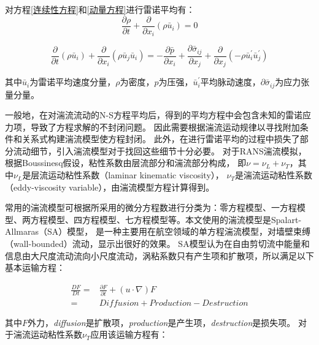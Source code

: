 \noindent 对方程\ref{连续性方程}和\ref{动量方程}进行雷诺平均有：
\begin{equation}\frac{\partial \rho}{\partial t}+\frac{\partial}{\partial x_{i}}\left(\rho \bar{u}_{i}\right)=0\end{equation}

\begin{equation}\frac{\partial}{\partial t}\left(\rho \bar{u}_{i}\right)+\frac{\partial}{\partial x_{i}}\left(\rho \bar{u}_{j} \bar{u}_{i}\right)=-\frac{\partial \bar{p}}{\partial x_{i}}+\frac{\partial \bar{\sigma}_{i j}}{\partial x_{j}}+\frac{\partial}{\partial x_{j}}\left(-\rho \bar{u}_{i}^{\prime} \bar{u}_{j}^{\prime}\right)\end{equation}

\noindent 其中$\bar{u}_{i}$为雷诺平均速度分量，$\rho$为密度，$p$为压强，$\bar{u}_{i}^{\prime}$平均脉动速度，$\partial \bar{\sigma}_{i j}$为应力张量分量。


一般地，在对湍流流动的N-S方程平均后，得到的平均方程中会包含未知的雷诺应力项，导致了方程求解的不封闭问题。
因此需要根据湍流运动规律以寻找附加条件和关系式构建湍流模型使方程封闭。
此外，在进行雷诺平均的过程中损失了部分流动细节，引入湍流模型对于找回这些细节十分必要。
对于RANS湍流模拟，根据Boussinesq\cite{schmitt2007boussinesq}假设，粘性系数由层流部分和湍流部分构成，
即$\nu=\nu_{L}+\nu_{T}$，其中$\nu_{L}$是层流运动粘性系数（laminar kinematic viscosity）， $\nu_{T}$是湍流运动粘性系数（eddy-viscosity variable），由湍流模型方程计算得到。

常用的湍流模型可根据所采用的微分方程数进行分类为：零方程模型、一方程模型、两方程模型、四方程模型、七方程模型等\cite{1998A}。本文使用的湍流模型是Spalart-Allmaras（SA）模型\cite{SAequation}，
是一种主要用在航空领域的单方程湍流模型，对墙壁束缚（wall-bounded）流动，显示出很好的效果。
SA模型认为在自由剪切流中能量和信息由大尺度流动流向小尺度流动，涡粘系数只有产生项和扩散项，所以满足以下基本运输方程：

\begin{equation}
\begin{split}
\frac{D F}{D t}= & \frac{\partial F}{\partial t}+(u \cdot \nabla) F \\ = & {Diffusion} + {Production} - {Destruction}
\end{split}
\end{equation}

\noindent 其中$F$外力，\textit{diffusion}是扩散项，\textit{production}是产生项，\textit{destruction}是损失项。
对于湍流运动粘性系数$\nu_{T}$应用该运输方程有：

